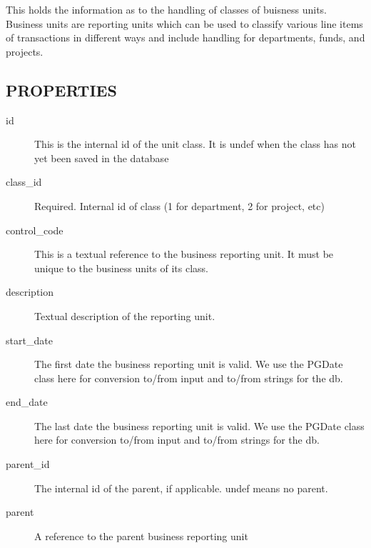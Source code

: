 \begin{description}
This holds the information as to the handling of classes of buisness units.  
Business units are reporting units which can be used to classify various line 
items of transactions in different ways and include handling for departments, 
funds, and projects.

\subsection*{PROPERTIES\label{LedgerSMB::DBObject::Business_Unit_Class_PROPERTIES}}
\begin{description}

\item[{id}] \mbox{}

This is the internal id of the unit class.  It is undef when the class has not
yet been saved in the database


\item[{class\_id}] \mbox{}

Required. Internal id of class (1 for department, 2 for project, etc)


\item[{control\_code}] \mbox{}

This is a textual reference to the business reporting unit.  It must be unique
to the business units of its class.


\item[{description}] \mbox{}

Textual description of the reporting unit.


\item[{start\_date}] \mbox{}

The first date the business reporting unit is valid.  We use the PGDate class
here for conversion to/from input and to/from strings for the db.


\item[{end\_date}] \mbox{}

The last date the business reporting unit is valid.  We use the PGDate class
here for conversion to/from input and to/from strings for the db.


\item[{parent\_id}] \mbox{}

The internal id of the parent, if applicable.  undef means no parent.


\item[{parent}] \mbox{}

A reference to the parent business reporting unit



\end{description}
\end{description}

